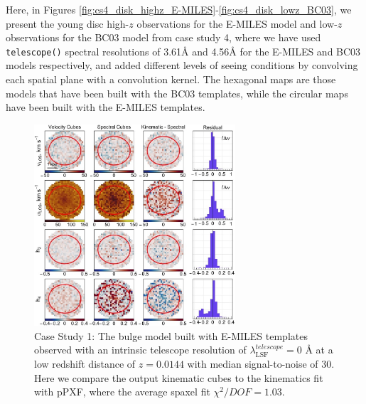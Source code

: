 \documentclass[
  journal=pasa,
  manuscript=research-paper, %
  year=2020,
  volume=37,
]{cup-journal}
\newcommand{\telescope}[1]{\texttt{telescope()}#1}
\begin{document}
Here, in Figures \ref{fig:cs4_disk_highz_E-MILES}-\ref{fig:cs4_disk_lowz_BC03}, we present the young disc high-$z$ observations for the E-MILES model and low-$z$ observations for the BC03 model from case study 4, where we have used \telescope{} spectral resolutions of 3.61\AA{} and 4.56\AA{} for the E-MILES and BC03 models respectively, and added different levels of seeing conditions by convolving each spatial plane with a convolution kernel. The hexagonal maps are those models that have been built with the BC03 templates, while the circular maps have been built with the E-MILES templates. 


\begin{figure}
    \centering
    \includegraphics[keepaspectratio, width=7.5cm]{cs1_bulge_velocities_lowz_EMILES.jpeg}
    \caption{Case Study 1: The bulge model built with E-MILES templates observed with an intrinsic telescope resolution of  $\lambda_{\text{LSF}}^{telescope} = 0$ \AA{} at a low redshift distance of $z = 0.0144$ with median signal-to-noise of 30. Here we compare the output kinematic cubes to the kinematics fit with pPXF, where the average spaxel fit $\chi^2/DOF = 1.03$.}
    \label{fig:cs1_bulge_E-MILES}
\end{figure}
\end{document}
